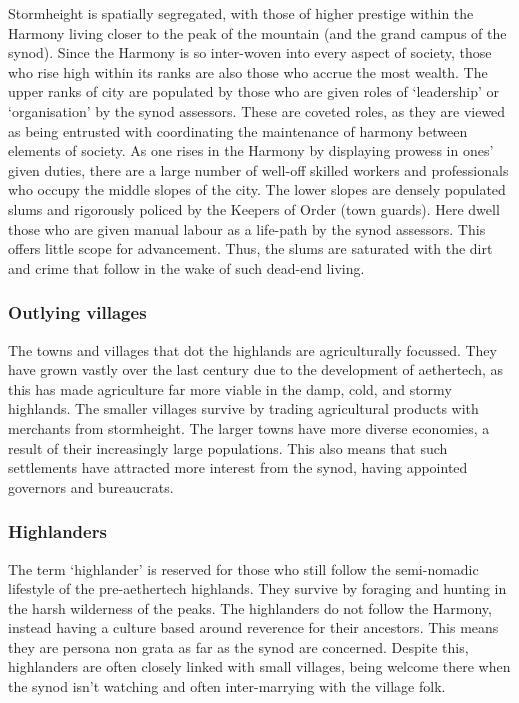 \documentclass[a4paper,11pt,oneside]{book}
\begin{document}
Stormheight is spatially segregated, with those of higher prestige within the Harmony living closer to the peak of the mountain (and the grand campus of the synod). Since the Harmony is so inter-woven into every aspect of society, those who rise high within its ranks are also those who accrue the most wealth. The upper ranks of city are populated by those who are given roles of `leadership' or `organisation' by the synod assessors. These are coveted roles, as they are viewed as being entrusted with coordinating the maintenance of harmony between elements of society. As one rises in the Harmony by displaying prowess in ones' given duties, there are a large number of well-off skilled workers and professionals who occupy the middle slopes of the city. The lower slopes are densely populated slums and rigorously policed by the Keepers of Order (town guards). Here dwell those who are given manual labour as a life-path by the synod assessors. This offers little scope for advancement. Thus, the slums are saturated with the dirt and crime that follow in the wake of such dead-end living.   

\subsubsection{Outlying villages}
The towns and villages that dot the highlands are agriculturally focussed. They have grown vastly over the last century due to the development of aethertech, as this has made agriculture far more viable in the damp, cold, and stormy highlands. The smaller villages survive by trading agricultural products with merchants from stormheight. The larger towns have more diverse economies, a result of their increasingly large populations. This also means that such settlements have attracted more interest from the synod, having appointed governors and bureaucrats. 

\subsubsection{Highlanders}
The term `highlander' is reserved for those who still follow the semi-nomadic lifestyle of the pre-aethertech highlands. They survive by foraging and hunting in the harsh wilderness of the peaks. The highlanders do not follow the Harmony, instead having a culture based around reverence for their ancestors. This means they are persona non grata as far as the synod are concerned. Despite this, highlanders are often closely linked with small villages, being welcome there when the synod isn't watching and often inter-marrying with the village folk.   
\end{document}
